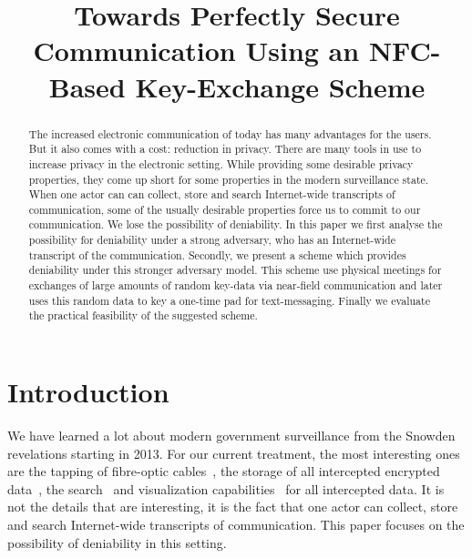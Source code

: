 \title{%
Towards Perfectly Secure Communication Using an NFC-Based Key-Exchange Scheme  
}

\maketitle
\begin{abstract}
  The increased electronic communication of today has many advantages for the 
  users.
  But it also comes with a cost: reduction in privacy.
  There are many tools in use to increase privacy in the electronic setting.
  While providing some desirable privacy properties, they come up short for 
  some properties in the modern surveillance state.
  When one actor can can collect, store and search Internet-wide transcripts of 
  communication, some of the usually desirable properties force us to commit to 
  our communication.
  We lose the possibility of deniability.
  In this paper we first analyse the possibility for deniability under a strong 
  adversary, who has an Internet-wide transcript of the communication.
  Secondly, we present a scheme which provides deniability under this stronger 
  adversary model.
  This scheme use physical meetings for exchanges of large amounts of random 
  key-data via near-field communication and later uses this random data to key 
  a one-time pad for text-messaging.
  Finally we evaluate the practical feasibility of the suggested scheme.

\end{abstract}


\acresetall{}
\section{Introduction}

We have learned a lot about modern government surveillance from the Snowden 
revelations starting in 2013.
For our current treatment, the most interesting ones are the tapping of 
fibre-optic cables~\cite{fibretap}, the storage of all intercepted encrypted 
data~\cite{cryptostore}, the search~\cite{xkeyscore} and visualization 
capabilities~\cite{boundlessinformant} for all intercepted data.
It is not the details that are interesting, it is the fact that one actor can 
collect, store and search Internet-wide transcripts of communication.
This paper focuses on the possibility of deniability in this setting.

